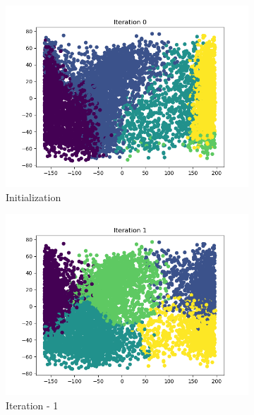 \documentclass[12pt]{article}
\begin{document}
\begin{figure}[H]
	\centering
	\begin{subfigure}{0.45\linewidth}
		\includegraphics[scale=0.45]{kmd/0.png}
		\caption{Initialization}
	\end{subfigure}%
	\begin{subfigure}{0.45\linewidth}
		\includegraphics[scale=0.45]{kmd/1.png}
		\caption{Iteration - 1}
	\end{subfigure}%
\hspace{2cm}
	\begin{subfigure}{0.45\linewidth}

\end{subfigure}
\end{figure}
\end{document}

